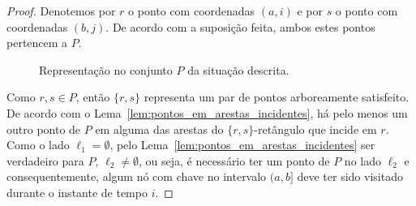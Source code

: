 \begin{proof}
Denotemos por $r$ o ponto com coordenadas $(a,i)$ e por $s$ o ponto com coordenadas $(b,j)$. De acordo com a suposição feita, ambos estes pontos pertencem a $P$.
\begin{figure}
    \centering
    \begin{adjustbox}{valign=t, raise=-25pt} %
    \end{adjustbox}
    \caption{Representação no conjunto $P$ da situação descrita.}
\label{fig:area_delimitada}
\end{figure}

Como $r,s \in P$, então $\{r,s\}$ representa um par de pontos arboreamente satisfeito. De acordo com o Lema~\ref{lem:pontos_em_arestas_incidentes}, há pelo menos um outro ponto de $P$ em alguma das arestas do $\{r,s\}$-retângulo que incide em $r$. Como o lado $\ell_1 = \emptyset$, pelo Lema~\ref{lem:pontos_em_arestas_incidentes} ser verdadeiro para $P$, $\ell_2 \neq \emptyset$, ou seja, é necessário ter um ponto de $P$ no lado $\ell_2$ e consequentemente, algum nó com chave no intervalo $(a,b]$ deve ter sido visitado durante o instante de tempo $i$.


\end{proof}
